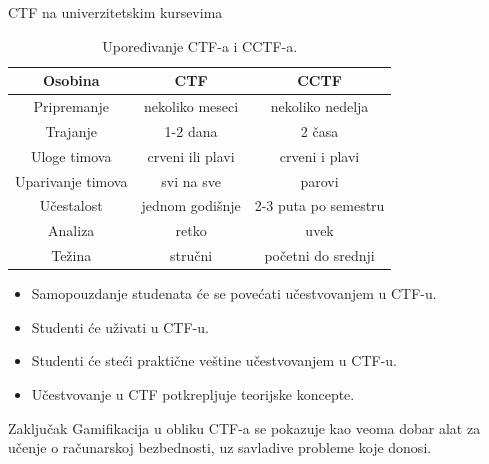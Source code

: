\documentclass{beamer}
\begin{document}
\begin{frame}[fragile]
\begin{columns}[T]
\begin{column}{.46\textwidth}
            \begin{block}{CTF na univerzitetskim kursevima}
                \begin{table}[!h]
                    \centering
                    \begin{tabular}{|c|c|c|}
                        \hline
                        \textbf{Osobina} & \textbf{CTF} & \textbf{CCTF} \\
                        \hline
                        \hline
                        Pripremanje & nekoliko meseci & nekoliko nedelja \\
                        Trajanje & 1-2 dana & 2 časa \\
                        Uloge timova & crveni ili plavi & crveni i plavi \\
                        Uparivanje timova & svi na sve & parovi \\
                        Učestalost & jednom godišnje & 2-3 puta po semestru \\
                        Analiza & retko & uvek \\
                        Težina & stručni & početni do srednji \\
                        \hline
                    \end{tabular}
                    \caption{Upoređivanje CTF-a i CCTF-a.}\label{tab:cctf}
                \end{table}
                \begin{itemize}
                    \item Samopouzdanje studenata će se povećati učestvovanjem
                        u CTF-u.
                    \item Studenti će uživati u CTF-u.
                    \item Studenti će steći praktične veštine učestvovanjem
                        u CTF-u.
                    \item Učestvovanje u CTF potkrepljuje teorijske koncepte.
                \end{itemize}
            \end{block}


            \begin{block}{Zaključak}
                Gamifikacija u obliku CTF-a se pokazuje kao veoma dobar alat
                za učenje o računarskoj bezbednosti, uz savladive probleme
                koje donosi.
            \end{block}


        \end{column}

    \end{columns}

\end{frame}
\end{document}
